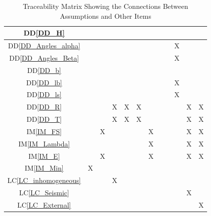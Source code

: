 \documentclass[12pt]{article}
\newcommand{\iref}[1]{IM\ref{#1}}
\newcommand{\ddref}[1]{DD\ref{#1}}
\newcommand{\lcref}[1]{LC\ref{#1}}
\begin{document}
\begin{table}[h!]
\begin{tabular}{|c|c|c|c|c|c|c|c|c|c|c|c|}
\ddref{DD_H}            & & & & & & & & & & & \\ \hline
\ddref{DD_Angles_alpha} & & & & & & & & & X& & \\ \hline
\ddref{DD_Angles_Beta}  & & & & & & & & & X& & \\ \hline
\ddref{DD_b}            & & & & & & & & & & & \\ \hline
\ddref{DD_lb}           & & & & & & & & & X& & \\ \hline
\ddref{DD_ls}           & & & & & & & & & X& & \\ \hline
\ddref{DD_R}            & & & X& X& X& & & & & X& X\\ \hline
\ddref{DD_T}            & & & X& X& X& & & & & X& X\\ \hline
\iref{IM_FS}            & & X& & & & X& & & & X& X\\ \hline
\iref{IM_Lambda}        & & & & & & X& & & & X& X\\ \hline
\iref{IM_E}             & & X& & & & X& & & & X& X\\ \hline
\iref{IM_Min}           & X& & & & & & & & & & \\ \hline
\lcref{LC_inhomogeneous}& & & X& & & & & & & & \\ \hline
\lcref{LC_Seismic}      & & & & & & & & & & X& \\ \hline
\lcref{LC_External}     & & & & & & & & & & & X\\
\hline
\end{tabular}
\caption{Traceability Matrix Showing the Connections Between Assumptions 
and Other Items}
\label{Table:A_trace}
\end{table}
\end{document}
